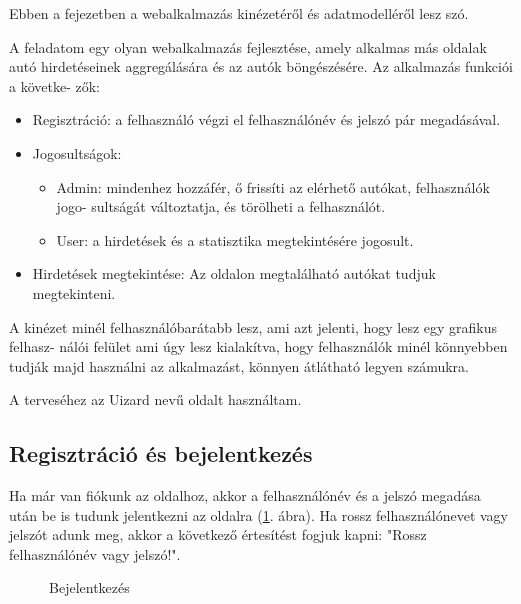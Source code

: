 Ebben a fejezetben a webalkalmazás kinézetéről és adatmodelléről lesz szó.



A feladatom egy olyan webalkalmazás fejlesztése, amely alkalmas más oldalak autó hirdetéseinek aggregálására és az autók böngészésére. Az alkalmazás funkciói a követke-
zők:

\begin{itemize}
\item Regisztráció: a felhasználó végzi el felhasználónév és jelszó pár megadásával.
\item Jogosultságok:
	\begin{itemize}
	\item Admin: mindenhez hozzáfér, ő frissíti az elérhető autókat, felhasználók jogo-
sultságát változtatja, és törölheti a felhasználót.
	\item User: a hirdetések és a statisztika megtekintésére jogosult.
	\end{itemize}
\item Hirdetések megtekintése: Az oldalon megtalálható autókat tudjuk megtekinteni.
\end{itemize}


A kinézet minél felhasználóbarátabb lesz, ami azt jelenti, hogy lesz egy grafikus felhasz-
nálói felület ami úgy lesz kialakítva, hogy felhasználók minél könnyebben tudják majd használni az alkalmazást, könnyen átlátható legyen számukra.

A terveséhez az Uizard \cite{uizard} nevű oldalt használtam.

\subsection{Regisztráció és bejelentkezés}

Ha már van fiókunk az oldalhoz, akkor a felhasználónév és a jelszó megadása után be is tudunk jelentkezni az oldalra (\ref{fig:Bejelentkezés}. ábra). Ha rossz felhasználónevet vagy jelszót adunk meg, akkor a következő értesítést fogjuk kapni: "Rossz felhasználónév vagy jelszó!".

\newpage

\begin{figure}[h]
\centering
{}
\caption{Bejelentkezés}
\label{fig:Bejelentkezés}
\end{figure}

